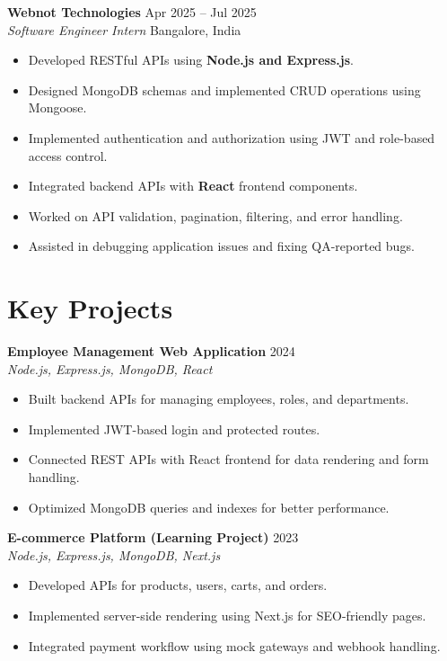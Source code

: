 \documentclass[9pt,a4paper]{article}
\begin{document}
\textbf{Webnot Technologies} \hfill Apr 2025 -- Jul 2025 \\
\textit{Software Engineer Intern } \hfill Bangalore, India
\begin{itemize}
    \item Developed RESTful APIs using \textbf{Node.js and Express.js}.
    \item Designed MongoDB schemas and implemented CRUD operations using Mongoose.
    \item Implemented authentication and authorization using JWT and role-based access control.
    \item Integrated backend APIs with \textbf{React} frontend components.
    \item Worked on API validation, pagination, filtering, and error handling.
    \item Assisted in debugging application issues and fixing QA-reported bugs.
\end{itemize}

\section*{Key Projects}

\textbf{Employee Management Web Application} \hfill 2024 \\
\textit{Node.js, Express.js, MongoDB, React}
\begin{itemize}
    \item Built backend APIs for managing employees, roles, and departments.
    \item Implemented JWT-based login and protected routes.
    \item Connected REST APIs with React frontend for data rendering and form handling.
    \item Optimized MongoDB queries and indexes for better performance.
\end{itemize}

\textbf{E-commerce Platform (Learning Project)} \hfill 2023 \\
\textit{Node.js, Express.js, MongoDB, Next.js}
\begin{itemize}
    \item Developed APIs for products, users, carts, and orders.
    \item Implemented server-side rendering using Next.js for SEO-friendly pages.
    \item Integrated payment workflow using mock gateways and webhook handling.
\end{itemize}
\end{document}
